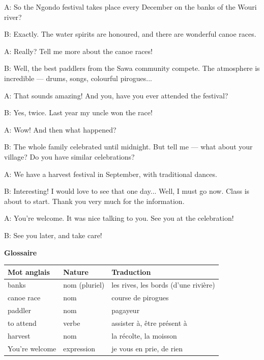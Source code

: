\documentclass[11pt]{article}
\begin{document}
\begin{textebox}
A: So the Ngondo festival takes place every December on the banks of the Wouri river?

B: Exactly. The water spirits are honoured, and there are wonderful canoe races.

A: Really? Tell me more about the canoe races!

B: Well, the best paddlers from the Sawa community compete. The atmosphere is incredible — drums, songs, colourful pirogues...

A: That sounds amazing! And you, have you ever attended the festival?

B: Yes, twice. Last year my uncle won the race!

A: Wow! And then what happened?

B: The whole family celebrated until midnight. But tell me — what about your village? Do you have similar celebrations?

A: We have a harvest festival in September, with traditional dances.

B: Interesting! I would love to see that one day... Well, I must go now. Class is about to start. Thank you very much for the information.

A: You're welcome. It was nice talking to you. See you at the celebration!

B: See you later, and take care!
\end{textebox}

\textbf{Glossaire}

\begin{center}
\begin{tabularx}{\linewidth}{|l|l|X|}
\hline
\rowcolor{popblueL} \textbf{Mot anglais} & \textbf{Nature} & \textbf{Traduction} \\
\hline
banks & nom (pluriel) & les rives, les bords (d'une rivière) \\
\hline
canoe race & nom & course de pirogues \\
\hline
paddler & nom & pagayeur \\
\hline
to attend & verbe & assister à, être présent à \\
\hline
harvest & nom & la récolte, la moisson \\
\hline
You're welcome & expression & je vous en prie, de rien \\
\hline
\end{tabularx}
\end{center}
\end{document}
